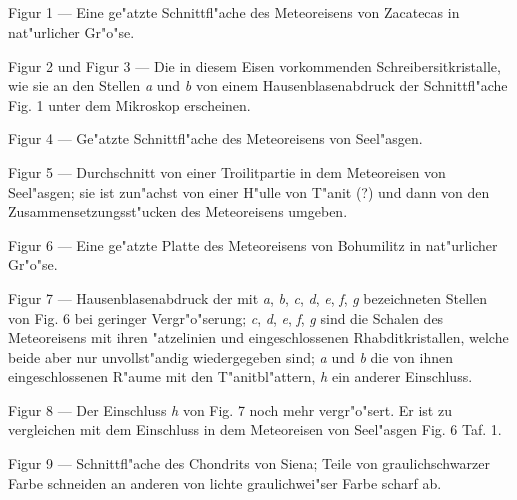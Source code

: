 \documentclass[a4paper, 11pt, oneside]{article}
\begin{document}
\subsection{}
\paragraph{}
Figur 1 --- Eine ge"atzte Schnittfl"ache des Meteoreisens von Zacatecas in nat"urlicher Gr"o"se.

Figur 2 und Figur 3 --- Die in diesem Eisen vorkommenden Schreibersitkristalle, wie sie an den Stellen \emph{a} und \emph{b} von einem Hausenblasenabdruck der Schnittfl"ache Fig. 1 unter dem Mikroskop erscheinen.

Figur 4 --- Ge"atzte Schnittfl"ache des Meteoreisens von Seel"asgen.

Figur 5 --- Durchschnitt von einer Troilitpartie in dem Meteoreisen von Seel"asgen; sie ist zun"achst von einer H"ulle von T"anit (?) und dann von den Zusammensetzungsst"ucken des Meteoreisens umgeben.

Figur 6 --- Eine ge"atzte Platte des Meteoreisens von Bohumilitz in nat"urlicher Gr"o"se.

Figur 7 --- Hausenblasenabdruck der mit \emph{a}, \emph{b}, \emph{c}, \emph{d}, \emph{e}, \emph{f}, \emph{g} bezeichneten Stellen von Fig. 6 bei geringer Vergr"o"serung; \emph{c}, \emph{d}, \emph{e}, \emph{f}, \emph{g} sind die Schalen des Meteoreisens mit ihren "atzelinien und eingeschlossenen Rhabditkristallen, welche beide aber nur unvollst"andig wiedergegeben sind; \emph{a} und \emph{b} die von ihnen eingeschlossenen R"aume mit den T"anitbl"attern, \emph{h} ein anderer Einschluss.

Figur 8 --- Der Einschluss \emph{h} von Fig. 7 noch mehr vergr"o"sert. Er ist zu vergleichen mit dem Einschluss in dem Meteoreisen von Seel"asgen Fig. 6 Taf. 1.

Figur 9 --- Schnittfl"ache des Chondrits von Siena; Teile von graulichschwarzer Farbe schneiden an anderen von lichte graulichwei"ser Farbe scharf ab.

\subsection{}
\end{document}
